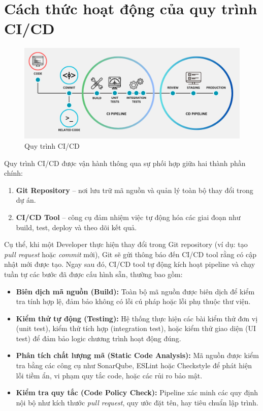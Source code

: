 \section{Cách thức hoạt động của quy trình CI/CD}

\begin{figure}[htbp]
	\centering
	\includegraphics[width=1\linewidth]{Ảnh/ci-cd-pipeline.png}
	\caption{Quy trình CI/CD}
	\label{fig:Quy trình CI/CD}
\end{figure}


Quy trình CI/CD được vận hành thông qua sự phối hợp giữa hai thành phần chính:
\begin{enumerate}
	\item \textbf{Git Repository} – nơi lưu trữ mã nguồn và quản lý toàn bộ thay đổi trong dự án.
	\item \textbf{CI/CD Tool} – công cụ đảm nhiệm việc tự động hóa các giai đoạn như build, test, deploy và theo dõi kết quả.
\end{enumerate}

Cụ thể, khi một Developer thực hiện thay đổi trong Git repository (ví dụ: tạo \textit{pull request} hoặc \textit{commit} mới), Git sẽ gửi thông báo đến CI/CD tool rằng có cập nhật mới được tạo. Ngay sau đó, CI/CD tool tự động kích hoạt pipeline và chạy tuần tự các bước đã được cấu hình sẵn, thường bao gồm:

\begin{itemize}
	\item \textbf{Biên dịch mã nguồn (Build):} Toàn bộ mã nguồn được biên dịch để kiểm tra tính hợp lệ, đảm bảo không có lỗi cú pháp hoặc lỗi phụ thuộc thư viện.
	\item \textbf{Kiểm thử tự động (Testing):} Hệ thống thực hiện các bài kiểm thử đơn vị (unit test), kiểm thử tích hợp (integration test), hoặc kiểm thử giao diện (UI test) để đảm bảo logic chương trình hoạt động đúng.
	\item \textbf{Phân tích chất lượng mã (Static Code Analysis):} Mã nguồn được kiểm tra bằng các công cụ như SonarQube, ESLint hoặc Checkstyle để phát hiện lỗi tiềm ẩn, vi phạm quy tắc code, hoặc các rủi ro bảo mật.
	\item \textbf{Kiểm tra quy tắc (Code Policy Check):} Pipeline xác minh các quy định nội bộ như kích thước \textit{pull request}, quy ước đặt tên, hay tiêu chuẩn lập trình.
\end{itemize}


